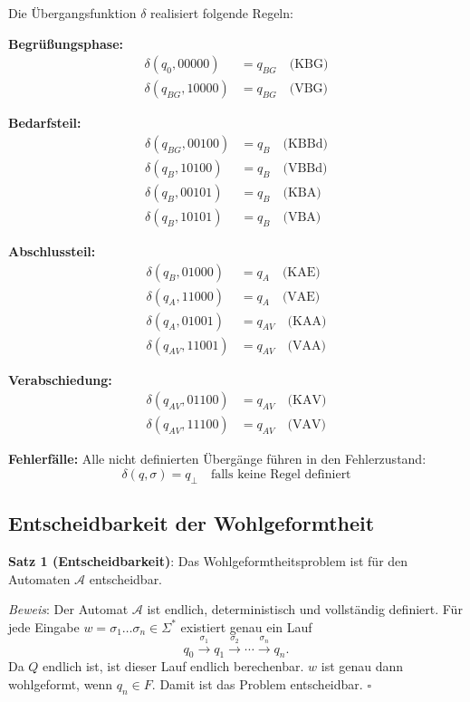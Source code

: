 \documentclass[
  12pt,
  a4paper,
  oneside,
  titlepage
]{article}
\begin{document}
Die Übergangsfunktion \(\delta\) realisiert folgende Regeln:

\textbf{Begrüßungsphase:}
\begin{align*}
\delta(q_0, 00000) &= q_{BG} \quad \text{(KBG)} \\
\delta(q_{BG}, 10000) &= q_{BG} \quad \text{(VBG)}
\end{align*}

\textbf{Bedarfsteil:}
\begin{align*}
\delta(q_{BG}, 00100) &= q_B \quad \text{(KBBd)} \\
\delta(q_B, 10100) &= q_B \quad \text{(VBBd)} \\
\delta(q_B, 00101) &= q_B \quad \text{(KBA)} \\
\delta(q_B, 10101) &= q_B \quad \text{(VBA)}
\end{align*}

\textbf{Abschlussteil:}
\begin{align*}
\delta(q_B, 01000) &= q_A \quad \text{(KAE)} \\
\delta(q_A, 11000) &= q_A \quad \text{(VAE)} \\
\delta(q_A, 01001) &= q_{AV} \quad \text{(KAA)} \\
\delta(q_{AV}, 11001) &= q_{AV} \quad \text{(VAA)}
\end{align*}

\textbf{Verabschiedung:}
\begin{align*}
\delta(q_{AV}, 01100) &= q_{AV} \quad \text{(KAV)} \\
\delta(q_{AV}, 11100) &= q_{AV} \quad \text{(VAV)}
\end{align*}

\textbf{Fehlerfälle:}
Alle nicht definierten Übergänge führen in den Fehlerzustand:
\[
\delta(q, \sigma) = q_\bot \quad \text{falls keine Regel definiert}
\]

\subsection{Entscheidbarkeit der Wohlgeformtheit}

\textbf{Satz 1 (Entscheidbarkeit)}: 
Das Wohlgeformtheitsproblem ist für den Automaten \(\mathcal{A}\) entscheidbar.

\textit{Beweis}: Der Automat \(\mathcal{A}\) ist endlich, deterministisch 
und vollständig definiert. Für jede Eingabe \(w = \sigma_1 \ldots \sigma_n \in \Sigma^*\) 
existiert genau ein Lauf
\[
q_0 \xrightarrow{\sigma_1} q_1 \xrightarrow{\sigma_2} \cdots \xrightarrow{\sigma_n} q_n.
\]
Da \(Q\) endlich ist, ist dieser Lauf endlich berechenbar. 
\(w\) ist genau dann wohlgeformt, wenn \(q_n \in F\). 
Damit ist das Problem entscheidbar. \(\square\)
\end{document}
